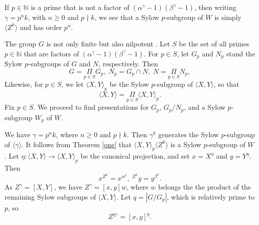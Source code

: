 \documentclass{amsart}
\theoremstyle{definition}
\theoremstyle{remark}
\newcommand \N{{\mathbb N}}
\begin{document}
If $p\in\N$  is a prime that is not a factor of $(\alpha^\gamma-1)(\beta^\gamma-1)$, then writing
$\gamma=p^n k$, with $n\geq 0$ and $p\nmid k$, we see that a Sylow $p$-subgroup of $W$ is simply $\langle Z^k\rangle$ and has order $p^n$.

 
The group $G$ is not only finite but also nilpotent \cite{M,Sz}. Let $S$ be
the set of all primes $p\in\N$ that are factors of $(\alpha^\gamma-1)(\beta^\gamma-1)$. 
For $p\in S$, let $G_p$ and $N_p$ stand the Sylow $p$-subgroups of $G$ and $N$, respectively.
Then
$$
G=\underset{p\in S}\Pi G_p,\; N_p=G_p\cap N,\; N=\underset{p\in S}\Pi N_p,
$$
Likewise, for $p\in S$, we let $\langle X,Y\rangle_p$ 
be the Sylow $p$-subgroup of $\langle X,Y\rangle$, so that
$$
\langle X,Y\rangle=\underset{p\in S}\Pi \langle X,Y\rangle_p.
$$
Fix $p\in S$. We proceed to find presentations for $G_p$, $G_p/N_p$, and a Sylow $p$-subgroup $W_p$ of $W$.

We have $\gamma=p^n k$, where $n\geq 0$ and $p\nmid k$. Then $\gamma^k$ generates the Sylow $p$-subgroup of $\langle \gamma\rangle$.
It follows from Theorem \ref{one} that $\langle X,Y\rangle_p\langle Z^k\rangle$ is a Sylow $p$-subgroup of $W$.
Let $\eta: \langle X,Y\rangle\to \langle X,Y\rangle_p$ be the canonical projection, and set $x=X^\eta$ and $y=Y^\eta$.
Then
\begin{equation}
\label{xzk}
x^{Z^k}=x^{\alpha^k},\; {}^{Z^k} y=y^{\beta^k}. 
\end{equation}
As $Z^\gamma=[X,Y]$, we have $Z^\gamma=[x,y]w$, where $w$ belongs the the product of the remaining Sylow subgroups of 
$\langle X,Y\rangle$. Let $q=|G/G_p|$, which is relatively prime to $p$, so
\begin{equation}
\label{xzk2}
Z^{q\gamma}=[x,y]^q.
\end{equation}
\end{document}
